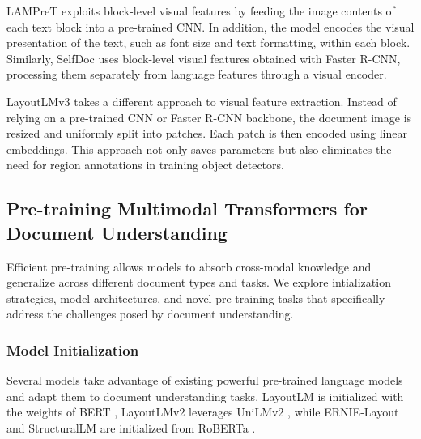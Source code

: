 \ac{LAMPreT} \citep{wu2021lampret} exploits block-level visual features by feeding the image contents of each text block into a pre-trained \ac{CNN}. In addition, the model encodes the visual presentation of the text, such as font size and text formatting, within each block. Similarly, SelfDoc \citep{li2021selfdoc} uses block-level visual features obtained with Faster R-CNN, processing them separately from language features through a visual encoder.  

LayoutLMv3 \citep{huang2022layoutlmv3} takes a different approach to visual feature extraction. Instead of relying on a pre-trained \ac{CNN} or Faster R-CNN backbone, the document image is resized and uniformly split into patches. Each patch is then encoded using linear embeddings. This approach not only saves parameters but also eliminates the need for region annotations in training object detectors.



\subsection{Pre-training Multimodal Transformers for Document Understanding}
\label{section:related-document-understanding-pretraining}

Efficient pre-training allows models to absorb cross-modal knowledge and generalize across different document types and tasks. We explore intialization strategies, model architectures, and novel pre-training tasks that specifically address the challenges posed by document understanding.

\subsubsection{Model Initialization} 

Several models take advantage of existing powerful pre-trained language models and adapt them to document understanding tasks. LayoutLM \citep{xu2020layoutlm} is initialized with the weights of \ac{BERT} \citep{devlin2018bert}, LayoutLMv2 \citep{xu2020layoutlmv2} leverages UniLMv2 \citep{bao2020unilmv2}, while ERNIE-Layout \citep{peng2022ernie} and StructuralLM \citep{li2021structurallm} are initialized from RoBERTa \citep{liu2019roberta}.

